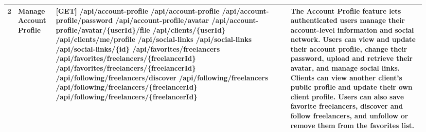 \begin{longtable}{|C{0.7cm}|L{2.6cm}|S{6.6cm}|L{5.2cm}|}
2
&
\textbf{Manage Account Profile}
&
[GET] /\allowbreak{}api/\allowbreak{}account-profile \newline
[PUT] /\allowbreak{}api/\allowbreak{}account-profile \newline
[PUT] /\allowbreak{}api/\allowbreak{}account-profile/\allowbreak{}password \newline
[POST] /\allowbreak{}api/\allowbreak{}account-profile/\allowbreak{}avatar \newline
[GET] /\allowbreak{}api/\allowbreak{}account-profile/\allowbreak{}avatar/\allowbreak{}\{userId\}/\allowbreak{}file \newline
[GET] /\allowbreak{}api/\allowbreak{}clients/\allowbreak{}\{userId\} \newline
[PUT] /\allowbreak{}api/\allowbreak{}clients/\allowbreak{}me/\allowbreak{}profile \newline
[GET] /\allowbreak{}api/\allowbreak{}social-links \newline
[POST] /\allowbreak{}api/\allowbreak{}social-links \newline
[DELETE] /\allowbreak{}api/\allowbreak{}social-links/\allowbreak{}\{id\} \newline
[GET] /\allowbreak{}api/\allowbreak{}favorites/\allowbreak{}freelancers \newline
[POST] /\allowbreak{}api/\allowbreak{}favorites/\allowbreak{}freelancers/\allowbreak{}\{freelancerId\} \newline
[DELETE] /\allowbreak{}api/\allowbreak{}favorites/\allowbreak{}freelancers/\allowbreak{}\{freelancerId\} \newline
[GET] /\allowbreak{}api/\allowbreak{}following/\allowbreak{}freelancers/\allowbreak{}discover \newline
[GET] /\allowbreak{}api/\allowbreak{}following/\allowbreak{}freelancers \newline
[POST] /\allowbreak{}api/\allowbreak{}following/\allowbreak{}freelancers/\allowbreak{}\{freelancerId\} \newline
[DELETE] /\allowbreak{}api/\allowbreak{}following/\allowbreak{}freelancers/\allowbreak{}\{freelancerId\}
&
The Account Profile feature lets authenticated users manage their account-level information and social network. Users can view and update their account profile, change their password, upload and retrieve their avatar, and manage social links. Clients can view another client's public profile and update their own client profile. Users can also save favorite freelancers, discover and follow freelancers, and unfollow or remove them from the favorites list.
\\ \hline


\end{longtable}
